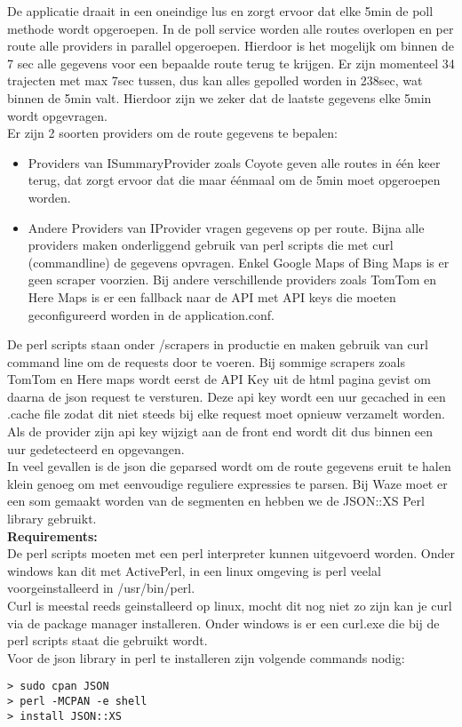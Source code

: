 De applicatie draait in een oneindige lus en zorgt ervoor dat elke 5min de poll methode wordt opgeroepen. In de poll service worden alle routes overlopen en per route alle providers in parallel opgeroepen. Hierdoor is het mogelijk om binnen de 7 sec alle gegevens voor een bepaalde route terug te krijgen. Er zijn momenteel 34 trajecten met max 7sec tussen, dus kan alles gepolled worden in 238sec, wat binnen de 5min valt. Hierdoor zijn we zeker dat de laatste gegevens elke 5min wordt opgevragen. \\ 

Er zijn 2 soorten providers om de route gegevens te bepalen:

\begin{itemize}
\item Providers van ISummaryProvider zoals Coyote geven alle routes in één keer terug, dat zorgt ervoor dat die maar éénmaal om de 5min moet opgeroepen worden.
\item Andere Providers van IProvider vragen gegevens op per route. Bijna alle providers maken onderliggend gebruik van perl scripts die met curl (commandline) de gegevens opvragen. Enkel Google Maps of Bing Maps is er geen scraper voorzien. Bij andere verschillende providers zoals TomTom en Here Maps is er een fallback naar de API met API keys die moeten geconfigureerd worden in de application.conf. 
\end{itemize}

De perl scripts staan onder /scrapers in productie en maken gebruik van curl command line om de requests door te voeren. Bij sommige scrapers zoals TomTom en Here maps wordt eerst de API Key uit de html pagina gevist om daarna de json request te versturen. Deze api key wordt een uur gecached in een .cache file zodat dit niet steeds bij elke request moet opnieuw verzamelt worden. Als de provider zijn api key wijzigt aan de front end wordt dit dus binnen een uur gedetecteerd en opgevangen. \\

In veel gevallen is de json die geparsed wordt om de route gegevens eruit te halen klein genoeg om met eenvoudige reguliere expressies te parsen. Bij Waze moet er een som gemaakt worden van de segmenten en hebben we de JSON::XS Perl library gebruikt. \\

\textbf{Requirements:} \\
De perl scripts moeten met een perl interpreter kunnen uitgevoerd worden. Onder windows kan dit met ActivePerl, in een linux omgeving is perl veelal voorgeinstalleerd in /usr/bin/perl. \\

Curl is meestal reeds geinstalleerd op linux, mocht dit nog niet zo zijn kan je curl via de package manager installeren. Onder windows is er een curl.exe die bij de perl scripts staat die gebruikt wordt. \\

Voor de json library in perl te installeren zijn volgende commands nodig: \\

\begin{lstlisting}
> sudo cpan JSON
> perl -MCPAN -e shell
> install JSON::XS
\end{lstlisting}